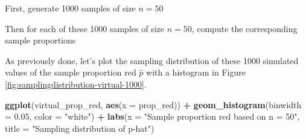 \documentclass[12pt,]{krantz}
\makeatletter
\newenvironment{Shaded}{\begin{snugshade}}{\end{snugshade}}
\newcommand{\KeywordTok}[1]{\textcolor[rgb]{0.27,0.27,0.27}{\textbf{#1}}}
\newcommand{\DataTypeTok}[1]{\textcolor[rgb]{0.27,0.27,0.27}{#1}}
\newcommand{\DecValTok}[1]{\textcolor[rgb]{0.06,0.06,0.06}{#1}}
\newcommand{\FloatTok}[1]{\textcolor[rgb]{0.06,0.06,0.06}{#1}}
\newcommand{\StringTok}[1]{\textcolor[rgb]{0.5,0.5,0.5}{#1}}
\newcommand{\OperatorTok}[1]{\textcolor[rgb]{0.43,0.43,0.43}{\textbf{#1}}}
\newcommand{\NormalTok}[1]{#1}
\newenvironment{kframe}{%
\medskip{}
\setlength{\fboxsep}{.8em}
 \def\at@end@of@kframe{}%
 \ifinner\ifhmode%
  \def\at@end@of@kframe{\end{minipage}}%
  \begin{minipage}{\columnwidth}%
 \fi\fi%
 \def\FrameCommand##1{\hskip\@totalleftmargin \hskip-\fboxsep
 \colorbox{shadecolor}{##1}\hskip-\fboxsep
     \hskip-\linewidth \hskip-\@totalleftmargin \hskip\columnwidth}%
 \MakeFramed {\advance\hsize-\width
   \@totalleftmargin\z@ \linewidth\hsize
   \@setminipage}}%
 {\par\unskip\endMakeFramed%
 \at@end@of@kframe}
\renewenvironment{Shaded}{\begin{kframe}}{\end{kframe}}
\makeatother
\begin{document}
First, generate 1000 samples of size \(n=50\)

\begin{Shaded}
\end{Shaded}

Then for each of these 1000 samples of size \(n=50\), compute the
corresponding sample proportions

\begin{Shaded}
\end{Shaded}

As previously done, let's plot the sampling distribution of these 1000
simulated values of the sample proportion red \(\widehat{p}\) with a
histogram in Figure \ref{fig:samplingdistribution-virtual-1000}.

\begin{Shaded}
\begin{Highlighting}[]
\KeywordTok{ggplot}\NormalTok{(virtual_prop_red, }\KeywordTok{aes}\NormalTok{(}\DataTypeTok{x =}\NormalTok{ prop_red)) }\OperatorTok{+}
\StringTok{  }\KeywordTok{geom_histogram}\NormalTok{(}\DataTypeTok{binwidth =} \FloatTok{0.05}\NormalTok{, }\DataTypeTok{color =} \StringTok{"white"}\NormalTok{) }\OperatorTok{+}
\StringTok{  }\KeywordTok{labs}\NormalTok{(}\DataTypeTok{x =} \StringTok{"Sample proportion red based on n = 50"}\NormalTok{, }
       \DataTypeTok{title =} \StringTok{"Sampling distribution of p-hat"}\NormalTok{) }
\end{Highlighting}
\end{Shaded}
\end{document}
